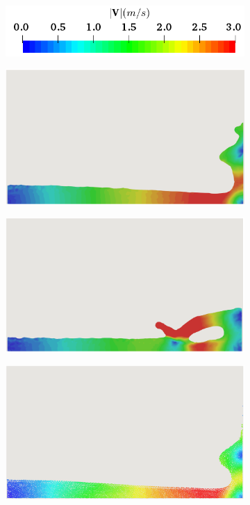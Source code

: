 \documentclass[final,3p,times]{elsarticle}
\begin{document}
\begin{figure}[H]
	\centering	
		\begin{subfigure}{0.35\columnwidth}	
		\centering
		\includegraphics[width=1.0\textwidth]{Images/DB_U.png}
	\end{subfigure}

	\begin{subfigure}{0.4\columnwidth}	
		\centering
		\includegraphics[width=1.0\textwidth]{Images/DB_FEM_1.png}
	\end{subfigure}
	\begin{subfigure}{0.4\columnwidth}
		\centering
		\includegraphics[width=1.0\textwidth]{Images/DB_FEM_2.png}
	\end{subfigure}
	\begin{subfigure}{0.4\columnwidth}	
	\centering
	\includegraphics[width=1.0\textwidth]{Images/DB_SPH_1.png}

\end{subfigure}
\end{figure}
\end{document}
